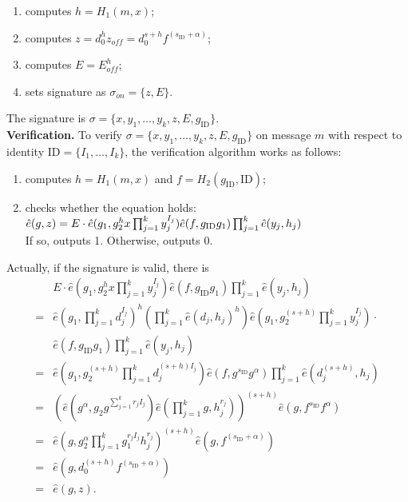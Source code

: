 \documentclass[times]{secauth}
\theoremstyle{definition}
\theoremstyle{remark}
\begin{document}
\begin{enumerate}
\item computes  $h = H_1(m, x)$;
\item computes $z = d_0^h z_{off} =  d_0^{s+h}f^{(s_\mathrm{ID} + \alpha)}$;
\item computes $E=E_{off}^h$;
\item sets signature as $\sigma_{on} = \{z, E\}$.
\end{enumerate}
\par
The signature is $\sigma = \{x, y_1, \ldots, y_k, z, E, g_{\mathrm{ID}}\}$.
\vspace{0.2cm}
\\
\textbf{Verification.} To verify $\sigma = \{x, y_1, \ldots, y_k, z, E, g_{\mathrm{ID}}\}$ on message $m$ with respect to identity $\mathrm{ID} = \{I_1, \ldots, I_k\}$, the verification algorithm works as follows:
\begin{enumerate}
\item computes $h = H_1(m, x)$ and $f = H_2(g_\mathrm{ID}, \mathrm{ID})$;
\item checks whether the equation holds:
$\hat{e}(g, z) = E \cdot \\ \hat{e}(g_1, g_2^hx\prod_{j=1}^k y_j^{I_j})\hat{e}(f, g_\mathrm{ID}g_1)\prod_{j=1}^k \hat{e}(y_j, h_j)$\\
If so, outputs 1. Otherwise, outputs 0.
\end{enumerate}
\par
Actually, if the signature is valid, there is 
\begin{align*}
&E \cdot \hat{e}(g_1, g_2^hx\prod_{j=1}^k y_j^{I_j})\hat{e}(f, g_\mathrm{ID}g_1)\prod_{j=1}^k \hat{e}(y_j, h_j)\\
=&\hat{e}(g_1, \prod_{j=1}^{k} d_j^{I_j})^h \left(\prod_{j=1}^{k} \hat{e}(d_j, h_j)^h\right)\hat{e}(g_1, g_2^{(s+h)}\prod_{j=1}^k y_j^{I_j}) \cdot\\
&\hat{e}(f, g_\mathrm{ID}g_1)\prod_{j=1}^k \hat{e}(y_j, h_j)\\
=&\hat{e}(g_1, g_2^{(s+h)}\prod_{j=1}^k d_j^{(s+h)I_j}) \hat{e}(f, g^{s_\mathrm{ID}}g^\alpha) \prod_{j=1}^{k} \hat{e}(d_j^{(s+h)}, h_j)\\
=&\left(\hat{e}(g^\alpha, g_2g^{\sum_{j=1}^kr_jI_j})\hat{e}(\prod_{j=1}^{k} g, h_j^{r_j})\right)^{(s+h)}\hat{e}(g, f^{s_\mathrm{ID}}f^\alpha)\\
=&\hat{e}(g,g_2^\alpha \prod_{j=1}^{k}g_1^{r_jI_j}h_j^{r_j})^{(s+h)}\hat{e}(g, f^{(s_\mathrm{ID}+\alpha)})\\
=&\hat{e}(g,d_0^{(s+h)}f^{(s_\mathrm{ID}+\alpha)})\\
=&\hat{e}(g, z).
\end{align*}
\end{document}
